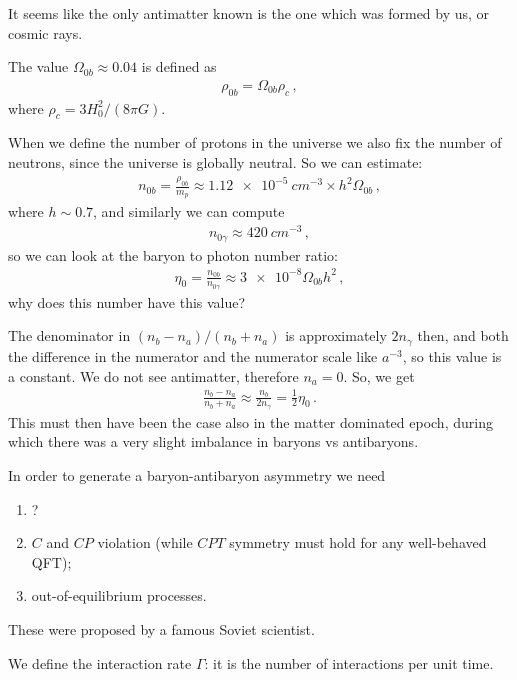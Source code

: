\documentclass[main.tex]{subfiles}
\begin{document}
It seems like the only antimatter known is the one which was formed by us, or cosmic rays.

The value \(\Omega_{0b} \approx 0.04\) is defined as 
%
\begin{align}
  \rho_{0b} = \Omega_{0b} \rho _{c} 
\,,
\end{align}
%
where \(\rho_c = 3 H_0^2 / (8 \pi G)\).

When we define the number of protons in the universe we also fix the number of neutrons, since the universe is globally neutral.
So we can estimate: 
%
\begin{align}
  n_{0b} = \frac{\rho_{0b}}{m_p} \approx \SI{1.12e-5}{cm^{-3}} \times h^2 \Omega_{0b}
\,,
\end{align}
%
where \(h \sim 0.7\),
and similarly we can compute 
%
\begin{align}
  n_{0 \gamma } \approx \SI{420}{cm^{-3}}
\,,
\end{align}
%
so we can 
look at the baryon to photon number ratio: 
%
\begin{align}
  \eta_0  = \frac{n_{0b}}{n_{0\gamma}}
  \approx \num{3e-8} \Omega_{0b} h^2
\,,
\end{align}
%
why does this number have this value? 

The denominator in \((n_b - n_a) / (n_b + n_a)\) is approximately \(2 n_{\gamma }\) then, and both the difference in the numerator and the numerator scale like \(a^{-3}\), so this value is a constant.
We do not see antimatter, therefore \(n_a = 0\). So, we get 
%
\begin{align}
    \frac{n_b - n_a}{n_b + n_a} \approx \frac{n_b}{2 n_\gamma } = \frac{1}{2} \eta_0 
\,.
\end{align}
%
This must then have been the case also in the matter dominated epoch, during which there was a very slight imbalance in baryons vs antibaryons.

In order to generate a baryon-antibaryon asymmetry we need \begin{enumerate}
    \item ?
    \item \(C\) and \(CP\) violation (while \(CPT\) symmetry must hold for any well-behaved QFT);
    \item out-of-equilibrium processes.
\end{enumerate}

These were proposed by a famous Soviet scientist.

We define the interaction rate \(\Gamma \): it is the number of interactions per unit time.
\end{document}
